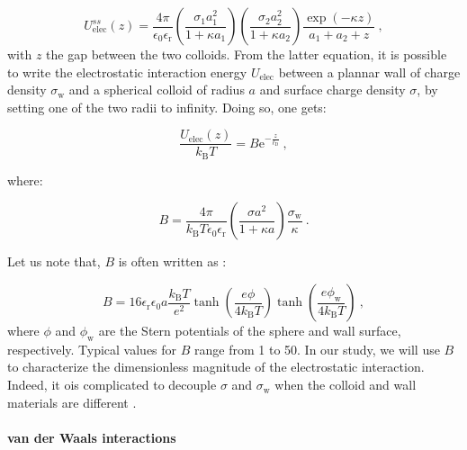 \begin{equation}
	U_\textrm{elec} ^{ss}(z) = \frac{4\pi}{\epsilon_0 \epsilon_\mathrm{r}} 
	\left(
	\frac{\sigma_1 a_1 ^2}{1 + \kappa a_1}
	\right)
	\left(
	\frac{\sigma_2 a_2 ^2}{1 + \kappa a_2}
	\right)
	\frac{\exp(-\kappa z)}{a_1 + a_2 + z} ~,
\end{equation} 
with $z$ the gap between the two colloids.
From the latter equation, it is possible to write the electrostatic interaction energy $U_\textrm{elec}$ between a plannar wall of charge density $\sigma_\textrm{w}$ and a spherical colloid of radius $a$ and surface charge density $\sigma$, by setting one of the two radii to infinity. Doing so, one gets:

\begin{equation}
	\frac{U_\textrm{elec}(z)}{k_\mathrm{B}T}  = B \mathrm{e}^{-\frac{z}{\ell_\mathrm{D}}}~,
	\label{Eq:Uelec}
\end{equation}

where:

\begin{equation}
	B = \frac{4 \pi}{ k_\mathrm{B}T\epsilon_0 \epsilon_\mathrm{r}} \left( \frac{\sigma a^2 }{1 + \kappa a}  \right) \frac{\sigma_\mathrm{w}}{\kappa} ~.
\end{equation}

Let us note that, $B$ is often written as \cite{behrens_charge_2001}:

\begin{equation}
	B = 16 \epsilon_\mathrm{r} \epsilon_0 a \frac{ k_\mathrm{B}T }{e^2} \tanh \left(\frac{e\phi}{4k_\mathrm{B}T}\right) \tanh \left(\frac{e\phi_\mathrm{w}}{4k_\mathrm{B}T}\right) ~,
\end{equation}
where $\phi$ and $\phi_\mathrm{w}$ are the Stern potentials of the sphere and wall surface, respectively. Typical values for $B$ range from 1 to 50. In our study, we will use $B$  to characterize the dimensionless magnitude of the electrostatic interaction. Indeed, it ois complicated to decouple $\sigma$ and $\sigma_\mathrm{w}$ when the colloid and wall materials are different \cite{behrens_charge_2001}.

\paragraph{van der Waals interactions}\mbox{}\\
\vspace{0.10cm}

